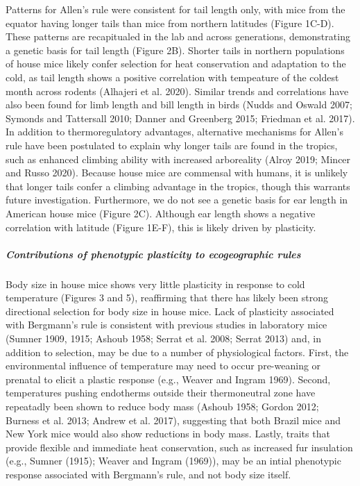 \documentclass[]{article}
\let\oldsubparagraph\subparagraph
\renewcommand{\subparagraph}[1]{\oldsubparagraph{#1}\mbox{}}
\begin{document}
Patterns for Allen's rule were consistent for tail length only, with
mice from the equator having longer tails than mice from northern
latitudes (Figure 1C-D). These patterns are recapitualed in the lab and
across generations, demonstrating a genetic basis for tail length
(Figure 2B). Shorter tails in northern populations of house mice likely
confer selection for heat conservation and adaptation to the cold, as
tail length shows a positive correlation with tempeature of the coldest
month across rodents (Alhajeri et al. 2020). Similar trends and
correlations have also been found for limb length and bill length in
birds (Nudds and Oswald 2007; Symonds and Tattersall 2010; Danner and
Greenberg 2015; Friedman et al. 2017). In addition to thermoregulatory
advantages, alternative mechanisms for Allen's rule have been postulated
to explain why longer tails are found in the tropics, such as enhanced
climbing ability with increased arboreality (Alroy 2019; Mincer and
Russo 2020). Because house mice are commensal with humans, it is
unlikely that longer tails confer a climbing advantage in the tropics,
though this warrants future investigation. Furthermore, we do not see a
genetic basis for ear length in American house mice (Figure 2C).
Although ear length shows a negative correlation with latitude (Figure
1E-F), this is likely driven by plasticity.

\vspace{2.5mm}

\hypertarget{contributions-of-phenotypic-plasticity-to-ecogeographic-rules}{%
\subparagraph{\texorpdfstring{\emph{Contributions of phenotypic
plasticity to ecogeographic
rules}}{Contributions of phenotypic plasticity to ecogeographic rules}}\label{contributions-of-phenotypic-plasticity-to-ecogeographic-rules}}

Body size in house mice shows very little plasticity in response to cold
temperature (Figures 3 and 5), reaffirming that there has likely been
strong directional selection for body size in house mice. Lack of
plasticity associated with Bergmann's rule is consistent with previous
studies in laboratory mice (Sumner 1909, 1915; Ashoub 1958; Serrat et
al. 2008; Serrat 2013) and, in addition to selection, may be due to a
number of physiological factors. First, the environmental influence of
temperature may need to occur pre-weaning or prenatal to elicit a
plastic response (e.g., Weaver and Ingram 1969). Second, temperatures
pushing endotherms outside their thermoneutral zone have repeatadly been
shown to reduce body mass (Ashoub 1958; Gordon 2012; Burness et al.
2013; Andrew et al. 2017), suggesting that both Brazil mice and New York
mice would also show reductions in body mass. Lastly, traits that
provide flexible and immediate heat conservation, such as increased fur
insulation (e.g., Sumner (1915); Weaver and Ingram (1969)), may be an
intial phenotypic response associated with Bergmann's rule, and not body
size itself.
\end{document}
